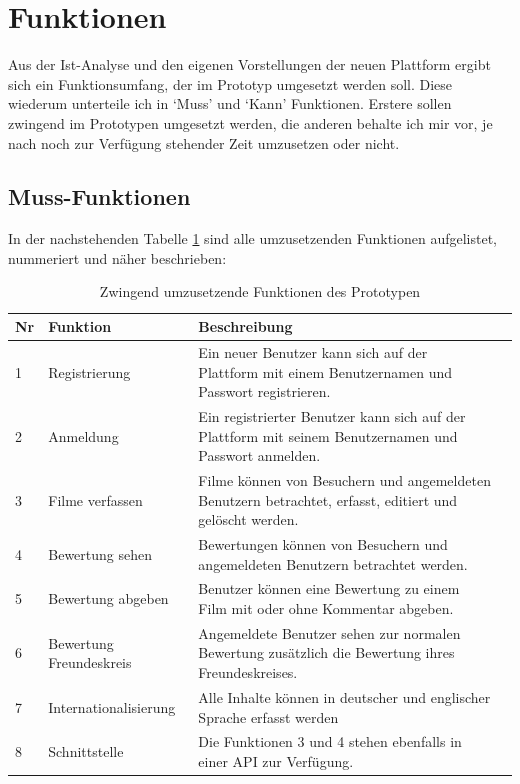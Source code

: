 \section{Funktionen}
Aus der Ist-Analyse und den eigenen Vorstellungen der neuen Plattform ergibt
sich ein Funktionsumfang, der im Prototyp umgesetzt werden soll. Diese
wiederum unterteile ich in `Muss' und `Kann' Funktionen. Erstere sollen
zwingend im Prototypen umgesetzt werden, die anderen behalte ich mir vor, je
nach noch zur Verfügung stehender Zeit umzusetzen oder nicht.

\subsection{Muss-Funktionen}
In der nachstehenden Tabelle \ref{tab:muss_funktionen} sind alle umzusetzenden 
Funktionen aufgelistet, nummeriert und näher beschrieben:

\begin{table}[h]
\begin{center}
    \begin{tabular}{llp{8cm}l}
        \toprule Nr & Funktion & Beschreibung \\
        \midrule 1 & Registrierung & Ein neuer Benutzer kann sich auf der Plattform
                     mit einem Benutzernamen und Passwort registrieren. \\
        \midrule 2 & Anmeldung & Ein registrierter Benutzer kann sich auf der
                     Plattform mit seinem Benutzernamen und Passwort anmelden. \\
        \midrule 3 & Filme verfassen & Filme können von Besuchern und angemeldeten Benutzern
                     betrachtet, erfasst, editiert und gelöscht werden. \\
        \midrule 4 & Bewertung sehen & Bewertungen können von Besuchern und angemeldeten Benutzern
                     betrachtet werden. \\
        \midrule 5 & Bewertung abgeben & Benutzer können eine Bewertung zu einem Film mit oder ohne
                     Kommentar abgeben. \\
        \midrule 6 & Bewertung Freundeskreis & Angemeldete Benutzer sehen zur normalen Bewertung zusätzlich
                     die Bewertung ihres Freundeskreises. \\
        \midrule 7 & Internationalisierung & Alle Inhalte können in deutscher und englischer
                     Sprache erfasst werden \\
        \midrule 8 & Schnittstelle & Die Funktionen 3 und 4 stehen ebenfalls in einer API 
                     zur Verfügung. \\
        \bottomrule
    \end{tabular}
    \caption{Zwingend umzusetzende Funktionen des Prototypen}
    \label{tab:muss_funktionen}
\end{center}
\end{table}

